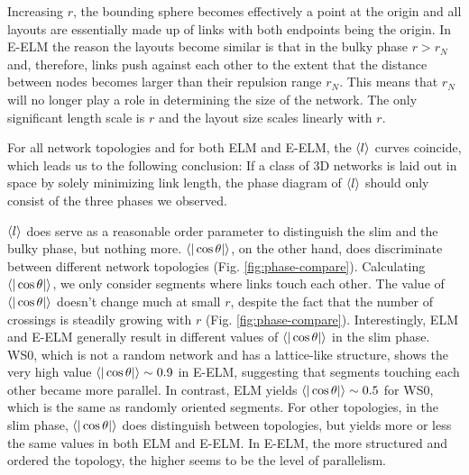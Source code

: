\documentclass[nofootinbib,preprint,endfloats]{revtex4} %
\begin{document}
Increasing $r$, the bounding sphere becomes effectively a point at the origin and all layouts are essentially made up of links with both endpoints being the origin. 
In E-ELM the reason the layouts become similar is that in the bulky phase $r > r_N$ and, therefore, links push against each other to the extent that the distance between nodes becomes larger than their repulsion range $r_N$. This means that $r_N$ will no longer play a role in determining the size of the network. The only significant length scale is $r$ and the layout size scales linearly with $r$. 

For all network topologies and for both ELM and E-ELM, the $\left<l\right>$ curves coincide, which leads us to the following conclusion: 
If a class of 3D networks is laid out in space by solely minimizing link length, the phase diagram of $\left<l\right>$ should only consist of the three phases we observed. 

$\left<l\right>$ does serve as a reasonable order parameter to distinguish the slim and the bulky phase, but nothing more. 
$\be{|\cos\theta|}$, on the other hand, does discriminate between different network topologies (Fig. \ref{fig:phase-compare}). 
Calculating $\be{|\cos\theta|}$, we only consider segments where links touch each other. 
The value of $\be{|\cos\theta|}$ doesn't change much at small $r$, despite the fact that the number of crossings is steadily growing with $r$ (Fig. \ref{fig:phase-compare}).
Interestingly, ELM and E-ELM  generally result in different values of $\be{|\cos\theta|}$ in the slim phase. 
WS0, which is not a random network and has a lattice-like structure, shows the very high value $\be{|\cos\theta|} \sim 0.9 $ in E-ELM, suggesting that segments touching each other became more parallel. In contrast, ELM yields  $\be{|\cos\theta|} \sim 0.5 $ for WS0, which is the same as randomly oriented segments. For other topologies, in the slim phase, $\be{|\cos\theta|} $ does distinguish between topologies, but yields more or less the same values in both ELM and E-ELM. In E-ELM, the more structured and ordered the topology, the higher seems to be the level of parallelism.  
\end{document}
